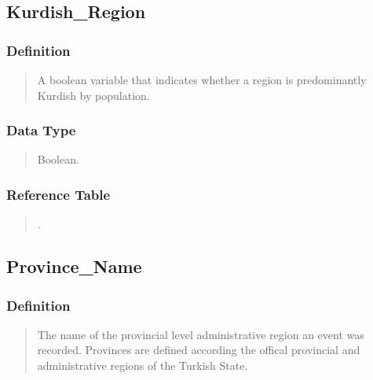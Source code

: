 \documentclass[letterpaper,10pt,english]{sphinxmanual}
\begin{document}
\subsection{Kurdish\_Region}
\label{\detokenize{schema_tables:kurdish-region}}

\subsubsection{Definition}
\label{\detokenize{schema_tables:id28}}\begin{quote}

\sphinxAtStartPar
A boolean variable that indicates whether a region is predominantly Kurdish by population.
\end{quote}


\subsubsection{Data Type}
\label{\detokenize{schema_tables:id29}}\begin{quote}

\sphinxAtStartPar
Boolean.
\end{quote}


\subsubsection{Reference Table}
\label{\detokenize{schema_tables:id30}}\begin{quote}

\sphinxAtStartPar
{\hyperref[\detokenize{schema_tables:overview-table}]{}}.
\end{quote}


\subsection{Province\_Name}
\label{\detokenize{schema_tables:province-name}}

\subsubsection{Definition}
\label{\detokenize{schema_tables:id31}}\begin{quote}

\sphinxAtStartPar
The name of the provincial level administrative region an event was recorded.  Provinces are defined according the offical provincial and administrative regions of the Turkish State.
\end{quote}
\end{document}
